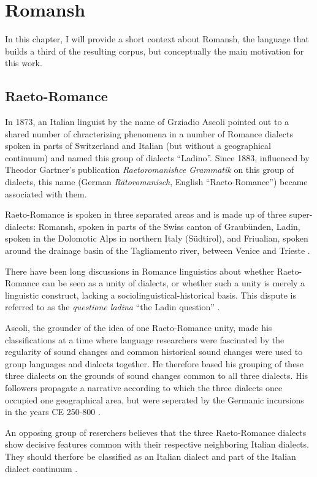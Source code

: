 \chapter{Romansh}

In this chapter, I will provide a short context about Romansh, the language that builds a third of the resulting corpus, but conceptually the main motivation for this work.

\section{Raeto-Romance}
In 1873, an Italian linguist by the name of Grziadio Ascoli pointed out to a shared number of chracterizing phenomena in a number of Romance dialects spoken in parts of Switzerland and Italian (but without a geographical continuum) and named this group of dialects \enquote{Ladino}. Since 1883, influenced by Theodor Gartner's publication \emph{Raetoromanishce Grammatik} on this group of dialects, this name (German \emph{Rätoromanisch}, English \enquote{Raeto-Romance}) became associated with them. 

Raeto-Romance is spoken in three separated areas and is made up of three super-dialects: Romansh, spoken in parts of the Swiss canton of Graubünden, Ladin, spoken in the Dolomotic Alps in northern Italy (Südtirol), and Friualian, spoken around the drainage basin of the Tagliamento river, between Venice and Trieste \autocite[1]{haiman1992}.

There have been long discussions in Romance linguistics about whether Raeto-Romance can be seen as a unity of dialects, or whether such a unity is merely a linguistic construct, lacking a sociolinguistical-historical basis. 
This dispute is referred to as the \emph{questione ladina} \enquote{the Ladin question} \autocite{liver1999}. 

Ascoli, the grounder of the idea of one Raeto-Romance unity, made his classifications at a time where language researchers were fascinated by the regularity of sound changes and common historical sound changes were used to group languages and dialects together. He therefore based his grouping of these three dialects on the grounds of sound changes common to all three dialects. 
His followers propagate a narrative according to which the three dialects once occupied one geographical area, but were seperated by the Germanic incursions in the years CE 250-800 \autocites[174]{bossong2008}[11]{haiman1992}.

An opposing group of reserchers believes that the three Raeto-Romance dialects show decisive  features common with their respective neighboring Italian dialects. 
They should therfore be classified as an Italian dialect and part of the Italian dialect continuum \autocite[174]{bossong2008}.

